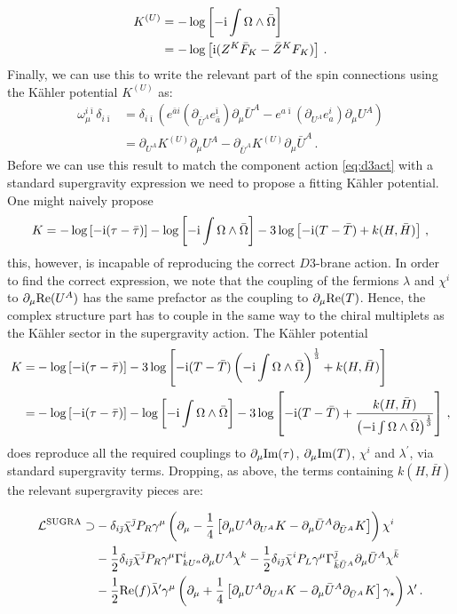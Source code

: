 \documentclass[12pt]{report}
\newcommand{\be}{\begin{equation}}
\newcommand{\ee}{\end{equation}}
\newcommand{\bea}{\begin{equation}\begin{aligned}}
\newcommand{\eea}{\end{aligned}\end{equation}}
\def\rmi{{\rm i}}
\def\ib{{\bar \imath}}
\def\jb{{\bar \jmath}}
\def\rmre{{\rm Re}}
\def\rmim{{\rm Im}}
\begin{document}
\bea 
K^{(U)} &= - \log \left[ -\rmi \int \Omega \wedge \bar{\Omega} \right] \\
&= - \log \left[ \rmi (Z^K \bar{F}_K - \bar{Z}^K F_K ) \right] \,.
\eea
Finally, we can use this to write the relevant part of the spin connections using the Kähler potential $K^{(U)}$ as:
\bea 
\omega_\mu^{i\ib} \delta_{i\ib} &= \delta_{i\ib} \left( e^{\bar{a}i} (\partial_{\bar{U}^A} e^{\ib}_{\bar{a}}) \partial_\mu \bar{U}^A - e^{a\ib} (\partial_{U^A} e^i_a )\partial_\mu U^A\right)\\
&= \partial_{U^A} K^{(U)} \partial_\mu U^A - \partial_{\bar{U}^A} K^{(U)} \partial_\mu \bar{U}^A\,.
\eea
Before we can use this result to match the component action \eqref{eq:d3act} with a standard supergravity expression we need to propose a fitting Kähler potential. One might naively propose 
\be
K = - \log\left[-\rmi (\tau-\bar{\tau})\right] - \log\left[-\rmi \int \Omega \wedge \bar{\Omega}\right] - 3 \log \left[-\rmi(T-\bar{T})  + k(H,\bar{H})\right]\,,
\ee
this, however, is incapable of reproducing the correct $D3$-brane action. In order to find the correct expression, we note that the coupling of the fermions $\lambda$ and $\chi^i$ to $\partial_\mu \rmre(U^A)$ has the same prefactor as the coupling to $\partial_\mu \rmre(T)$. Hence, the complex structure part has to couple in the same way to the chiral multiplets as the Kähler sector in the supergravity action. The Kähler potential
\bea 
K =& - \log\left[-\rmi (\tau-\bar{\tau})\right] - 3 \log \left[-\rmi(T-\bar{T}) \left(-\rmi\int \Omega \wedge \bar{\Omega}\right)^{\frac{1}{3}} + k(H,\bar{H})\right]\\
=&  - \log\left[-\rmi (\tau-\bar{\tau})\right] - \log\left[-\rmi \int \Omega \wedge \bar{\Omega}\right] - 3 \log \left[-\rmi(T-\bar{T})  + \frac{k(H,\bar{H})}{\left(-\rmi\int \Omega \wedge \bar{\Omega}\right)^{\frac{1}{3}}}\right]\,,
\label{eq:deKpot}
\eea
does reproduce all the required couplings to $\partial_{\mu} \rmim(\tau)$, $\partial_\mu \rmim(T)$, $\chi^i$ and $\lambda^\prime$, via standard supergravity terms. Dropping, as above, the terms containing $k(H,\bar{H})$ the relevant supergravity pieces are:

\bea 
\mathcal{L}^{\text{SUGRA}} \supset &-\delta_{i\jb} \bar{\chi}^\jb P_R \gamma^\mu \left( \partial_\mu - \frac{1}{4} \left[\partial_\mu U^A \partial_{U^A} K - \partial_\mu \bar{U}^A \partial_{\bar{U}^A} K \right]\right)\chi^i\\
&- \frac{1}{2} \delta_{i\jb} \bar{\chi}^\jb P_R \gamma^\mu \Gamma^i_{kU^a} \partial_\mu U^A \chi^k-\frac{1}{2} \delta_{i\jb} \bar{\chi}^i P_L \gamma^\mu \Gamma^\jb_{\bar{k}\bar{U}^A} \partial_\mu \bar{U}^A \chi^{\bar{k}}\\
&-\frac{1}{2} \rmre(f)\bar{\lambda}^\prime \gamma^\mu \left( \partial_\mu + \frac{1}{4} \left[\partial_\mu U^A \partial_{U^A} K - \partial_\mu \bar{U}^A \partial_{\bar{U}^A} K\right]\gamma_\star\right)\lambda^\prime\,.
\eea
\end{document}
